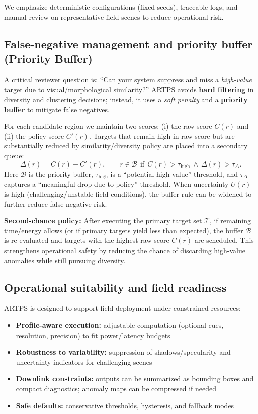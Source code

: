 \documentclass[12pt]{article}
\begin{document}
We emphasize deterministic configurations (fixed seeds), traceable logs, and manual review on representative field scenes to reduce operational risk.

\subsection{False-negative management and priority buffer (Priority Buffer)}
A critical reviewer question is: “Can your system suppress and miss a \emph{high-value} target due to visual/morphological similarity?” ARTPS avoids \textbf{hard filtering} in diversity and clustering decisions; instead, it uses a \emph{soft penalty} and a \textbf{priority buffer} to mitigate false negatives.

For each candidate region we maintain two scores: (i) the raw score \(C(r)\) and (ii) the policy score \(C'(r)\). Targets that remain high in raw score but are substantially reduced by similarity/diversity policy are placed into a secondary queue:
\[
\Delta(r)=C(r)-C'(r),\qquad
r\in\mathcal{B}\ \ \text{if}\ \ C(r)>\tau_{\text{high}}\ \wedge\ \Delta(r)>\tau_{\Delta}.
\]
Here \(\mathcal{B}\) is the priority buffer, \(\tau_{\text{high}}\) is a “potential high-value” threshold, and \(\tau_{\Delta}\) captures a “meaningful drop due to policy” threshold. When uncertainty \(U(r)\) is high (challenging/unstable field conditions), the buffer rule can be widened to further reduce false-negative risk.

\textbf{Second-chance policy:} After executing the primary target set \(\mathcal{T}\), if remaining time/energy allows (or if primary targets yield less than expected), the buffer \(\mathcal{B}\) is re-evaluated and targets with the highest raw score \(C(r)\) are scheduled. This strengthens operational safety by reducing the chance of discarding high-value anomalies while still pursuing diversity.

\subsection{Operational suitability and field readiness}
ARTPS is designed to support field deployment under constrained resources:
\begin{itemize}
\item \textbf{Profile-aware execution:} adjustable computation (optional cues, resolution, precision) to fit power/latency budgets
\item \textbf{Robustness to variability:} suppression of shadows/specularity and uncertainty indicators for challenging scenes
\item \textbf{Downlink constraints:} outputs can be summarized as bounding boxes and compact diagnostics; anomaly maps can be compressed if needed
\item \textbf{Safe defaults:} conservative thresholds, hysteresis, and fallback modes
\end{itemize}
\end{document}
